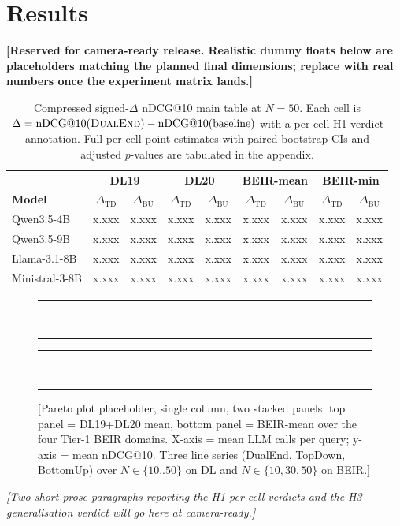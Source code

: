 \section{Results}
\label{sec:results}

\textbf{[Reserved for camera-ready release. Realistic dummy floats below
are placeholders matching the planned final dimensions; replace with real
numbers once the experiment matrix lands.]}

\begin{table}[t]
\centering\small
\begin{tabular}{l|cc|cc|cc|cc}
\toprule
& \multicolumn{2}{c|}{\textbf{DL19}} & \multicolumn{2}{c|}{\textbf{DL20}} & \multicolumn{2}{c|}{\textbf{BEIR-mean}} & \multicolumn{2}{c}{\textbf{BEIR-min}} \\
\textbf{Model} & $\Delta_\text{TD}$ & $\Delta_\text{BU}$ & $\Delta_\text{TD}$ & $\Delta_\text{BU}$ & $\Delta_\text{TD}$ & $\Delta_\text{BU}$ & $\Delta_\text{TD}$ & $\Delta_\text{BU}$ \\
\midrule
Qwen3.5-4B   & x.xxx & x.xxx & x.xxx & x.xxx & x.xxx & x.xxx & x.xxx & x.xxx \\
Qwen3.5-9B   & x.xxx & x.xxx & x.xxx & x.xxx & x.xxx & x.xxx & x.xxx & x.xxx \\
Llama-3.1-8B & x.xxx & x.xxx & x.xxx & x.xxx & x.xxx & x.xxx & x.xxx & x.xxx \\
Ministral-3-8B & x.xxx & x.xxx & x.xxx & x.xxx & x.xxx & x.xxx & x.xxx & x.xxx \\
\bottomrule
\end{tabular}
\caption{Compressed signed-$\Delta$ nDCG@10 main table at $N{=}50$.
Each cell is $\Delta = \text{nDCG@10}(\textsc{DualEnd}) -
\text{nDCG@10}(\text{baseline})$ with a per-cell H1 verdict annotation.
Full per-cell point estimates with paired-bootstrap CIs and adjusted
$p$-values are tabulated in the appendix.}
\label{tab:main-results}
\end{table}

\begin{figure}[t]
\centering
\rule{\columnwidth}{0.4pt}\\
\rule{0.4pt}{4cm}\hfill\rule{0.4pt}{4cm}\\
\rule{\columnwidth}{0.4pt}
\caption{[Pareto plot placeholder, single column, two stacked panels: top
panel = DL19+DL20 mean, bottom panel = BEIR-mean over the four Tier-1
BEIR domains. X-axis = mean LLM calls per query; y-axis = mean nDCG@10.
Three line series (DualEnd, TopDown, BottomUp) over $N \in \{10..50\}$
on DL and $N \in \{10,30,50\}$ on BEIR.]}
\label{fig:pareto}
\end{figure}

\textit{[Two short prose paragraphs reporting the H1 per-cell verdicts
and the H3 generalisation verdict will go here at camera-ready.]}
